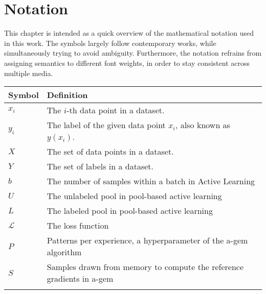 \chapter*{Notation}
\label{ch:notation}

This chapter is intended as a quick overview of the mathematical notation used in this work.
The symbols largely follow contemporary works, while simultaneously trying to avoid ambiguity.
Furthermore, the notation refrains from assigning semantics to different font weights, in order to stay consistent across multiple media.

\begin{tabularx}{\textwidth}{l X}
    \toprule
    Symbol & Definition \\
    \midrule
    $x_i$ & The $i$-th data point in a dataset. \\ \addlinespace
    $y_i$ & The label of the given data point $x_i$, also known as $y(x_i)$. \\ \addlinespace
    $X$ & The set of data points in a dataset. \\ \addlinespace
    $Y$ & The set of labels in a dataset. \\ \addlinespace
    $b$ & The number of samples within a batch in Active Learning \\ \addlinespace
    $U$ & The unlabeled pool in pool-based active learning\\ \addlinespace
    $L$ & The labeled pool in pool-based active learning\\ \addlinespace
    $\mathcal{L}$ & The loss function \\ \addlinespace
    $P$ & Patterns per experience, a hyperparameter of the \gls{a-gem} algorithm \\ \addlinespace
    $S$ & Samples drawn from memory to compute the reference gradients in \gls{a-gem} \\ \addlinespace
    \bottomrule
\end{tabularx}
\label{tab:notation}